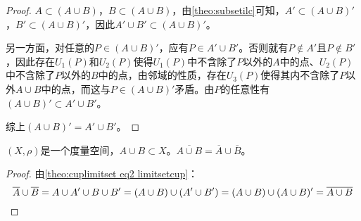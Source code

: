 \begin{proof}
	$A\subset (A\cup B)$，$B\subset (A\cup B)$，由\cref{theo:subsetilc}可知，$A'\subset(A\cup B)'$，$B'\subset(A\cup B)'$，因此$A'\cup B'\subset(A\cup B)'$。\par
	另一方面，对任意的$ P\in (A\cup B)'$，应有$P\in A'\cup B'$。否则就有$P\notin A'$且$P\notin B'$，因此存在$U_1(P)$和$U_2(P)$使得$U_1(P)$中不含除了$P$以外的$A$中的点、$U_2(P)$中不含除了$P$以外的$B$中的点，由邻域的性质，存在$U_3(P)$使得其内不含除了$P$以外$A\cup B$中的点，而这与$P\in (A\cup B)'$矛盾。由$P$的任意性有$(A\cup B)'\subset A'\cup B'$。\par
	综上$(A\cup B)'=A'\cup B'$。
\end{proof}
\begin{theorem}
	$(X,\rho)$是一个度量空间，$A\cup B\subset X$。$\overline{A\cup B}=\overline{A}\cup \overline{B}$。
\end{theorem}
\begin{proof}
	由\cref{theo:cuplimitset eq2 limitsetcup}：
	\begin{equation*}
		\overline{A}\cup \overline{B}=A\cup A'\cup B\cup B'
		=(A\cup B)\cup(A'\cup B')=(A\cup B)\cup(A\cup B)'
		=\overline{A\cup B}\qedhere
	\end{equation*}
\end{proof}